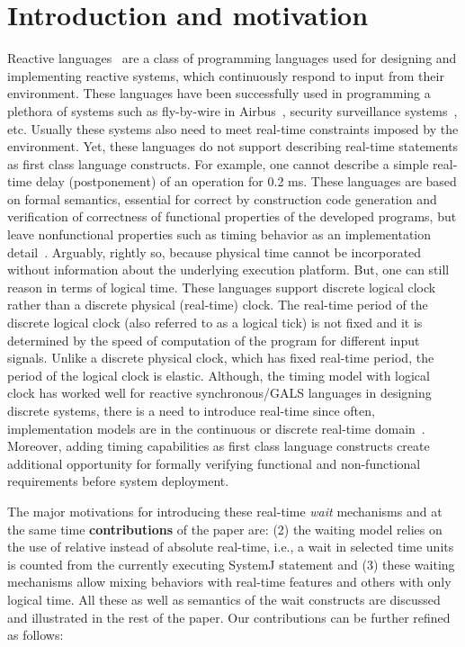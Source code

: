 \section{Introduction and motivation}
\label{sec:intr-motiv}

Reactive languages~\cite{gber931,amal10} are a class of programming
languages used for designing and implementing reactive systems, which
continuously respond to input from their environment. These languages
have been successfully used in programming a plethora of systems such as
fly-by-wire in Airbus~\cite{eairbus}, security surveillance
systems~\cite{amal121}, etc. Usually these systems also need to meet
real-time constraints imposed by the environment. Yet, these languages
do not support describing real-time statements as first class language
constructs.  For example, one cannot describe a simple real-time delay
(postponement) of an operation for 0.2 ms. These languages are based on
formal semantics, essential for correct by construction code generation
and verification of correctness of functional properties of the
developed programs, but leave nonfunctional properties such as timing
behavior as an implementation detail~\cite{boldt07}. Arguably, rightly
so, because physical time cannot be incorporated without information
about the underlying execution platform.  But, one can still reason in
terms of logical time. These languages support discrete logical clock
rather than a discrete physical (real-time) clock. The real-time period
of the discrete logical clock (also referred to as a logical tick) is
not fixed and it is determined by the speed of computation of the
program for different input signals. Unlike a discrete physical clock,
which has fixed real-time period, the period of the logical clock is
elastic. Although, the timing model with logical clock has worked well
for reactive synchronous/GALS languages in designing discrete systems,
there is a need to introduce real-time since often, implementation
models are in the continuous or discrete real-time
domain~\cite{DBLP:journals/pieee/SifakisTY03}.  Moreover, adding timing
capabilities as first class language constructs create additional
opportunity for formally verifying functional and non-functional
requirements before system deployment.



The major motivations for introducing these real-time \textit{wait}
mechanisms and at the same time \textbf{contributions} of the paper are:
 (2) the waiting model
relies on the use of relative instead of absolute real-time, i.e., a
wait in selected time units is counted from the currently executing
SystemJ statement and (3) these waiting mechanisms allow mixing
behaviors with real-time features and others with only logical time. All
these as well as semantics of the wait constructs are discussed and
illustrated in the rest of the paper. Our contributions can be further
refined as follows:

